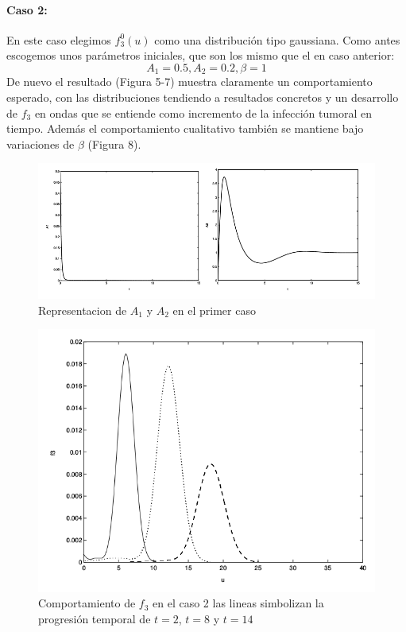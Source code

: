 \documentclass[1p]{elsarticle}
\begin{document}
 \paragraph{Caso 2:}
 En este caso elegimos $f_3^0(u)$ como una distribución tipo gaussiana. Como antes escogemos unos parámetros iniciales, que son los mismo que el en caso anterior:
 $$A_1 = 0.5, A_2 = 0.2, \beta = 1$$
 De nuevo el resultado (Figura 5-7) muestra claramente un comportamiento esperado, con las distribuciones tendiendo a resultados concretos y un desarrollo de $f_3$ en ondas que se entiende como incremento de la infección tumoral en tiempo. Además el comportamiento cualitativo también se mantiene bajo variaciones de $\beta$ (Figura 8).
\begin{figure}
	\centering
	\includegraphics[width=1\textwidth]{test2A1A2.png}
	\caption{Representacion de $A_1$ y $A_2$ en el primer caso}
	\label{fig:ejemplo2}
\end{figure}
\begin{figure}
	\centering
	\includegraphics[width=1\textwidth]{test2F3.png}
	\caption{Comportamiento de $f_3$ en el caso 2 las lineas simbolizan la progresión temporal de $t=2$, $t=8$ y $t=14$ }
	\label{fig:ejemplo3}
\end{figure}
\end{document}

